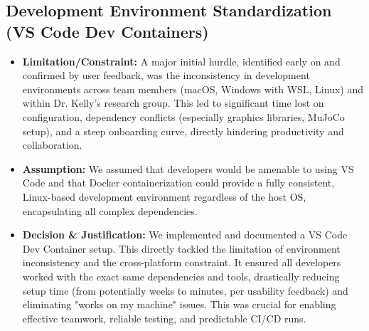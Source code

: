 \documentclass{article}
\begin{document}
\subsection{Development Environment Standardization (VS Code Dev Containers)}
\begin{itemize}
    \item \textbf{Limitation/Constraint:} A major initial hurdle, identified early on and confirmed by user feedback, was the inconsistency in development environments across team members (macOS, Windows with WSL, Linux) and within Dr. Kelly's research group. This led to significant time lost on configuration, dependency conflicts (especially graphics libraries, MuJoCo setup), and a steep onboarding curve, directly hindering productivity and collaboration.
    \item \textbf{Assumption:} We assumed that developers would be amenable to using VS Code and that Docker containerization could provide a fully consistent, Linux-based development environment regardless of the host OS, encapsulating all complex dependencies.
    \item \textbf{Decision \& Justification:} We implemented and documented a VS Code Dev Container setup. This directly tackled the limitation of environment inconsistency and the cross-platform constraint. It ensured all developers worked with the exact same dependencies and tools, drastically reducing setup time (from potentially weeks to minutes, per usability feedback) and eliminating "works on my machine" issues. This was crucial for enabling effective teamwork, reliable testing, and predictable CI/CD runs.
\end{itemize}
\end{document}
